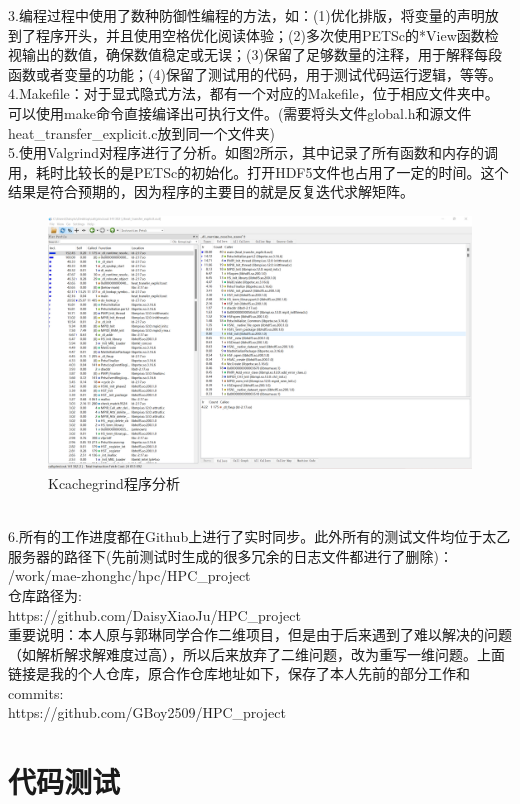 \documentclass{article}
\begin{document}
		3.编程过程中使用了数种防御性编程的方法，如：(1)优化排版，将变量的声明放到了程序开头，并且使用空格优化阅读体验；(2)多次使用PETSc的*View函数检视输出的数值，确保数值稳定或无误；(3)保留了足够数量的注释，用于解释每段函数或者变量的功能；(4)保留了测试用的代码，用于测试代码运行逻辑，等等。
		\\
		4.Makefile：对于显式隐式方法，都有一个对应的Makefile，位于相应文件夹中。可以使用make命令直接编译出可执行文件。(需要将头文件global.h和源文件heat\_transfer\_explicit.c放到同一个文件夹)
		\\
		5.使用Valgrind对程序进行了分析。如图2所示，其中记录了所有函数和内存的调用，耗时比较长的是PETSc的初始化。打开HDF5文件也占用了一定的时间。这个结果是符合预期的，因为程序的主要目的就是反复迭代求解矩阵。
		\begin{figure}
			\centering
			\includegraphics[width=1.0\linewidth]{screenshot002}
			\caption{Kcachegrind程序分析}
			\label{fig:screenshot002}
		\end{figure}
		\\
		6.所有的工作进度都在Github上进行了实时同步。此外所有的测试文件均位于太乙服务器的路径下(先前测试时生成的很多冗余的日志文件都进行了删除)：
		\\
		/work/mae-zhonghc/hpc/HPC\_project
		\\
		仓库路径为:
		\\https://github.com/DaisyXiaoJu/HPC\_project
		\\重要说明：本人原与郭琳同学合作二维项目，但是由于后来遇到了难以解决的问题（如解析解求解难度过高），所以后来放弃了二维问题，改为重写一维问题。上面链接是我的个人仓库，原合作仓库地址如下，保存了本人先前的部分工作和commits:
		\\https://github.com/GBoy2509/HPC\_project
		
		\section{代码测试}
\end{document}
